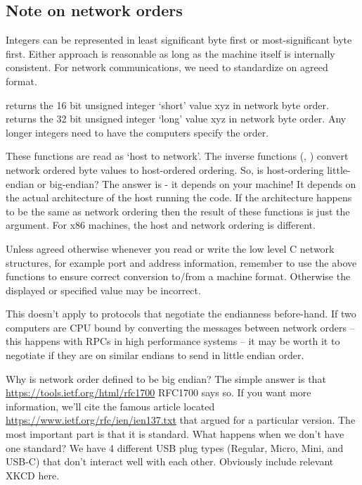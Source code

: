 \subsection{Note on network orders}

Integers can be represented in least significant byte first or most-significant byte first.
Either approach is reasonable as long as the machine itself is internally consistent.
For network communications, we need to standardize on agreed format.

 returns the 16 bit unsigned integer `short' value xyz in network byte order.
 returns the 32 bit unsigned integer `long' value xyz in network byte order.
Any longer integers need to have the computers specify the order.

These functions are read as `host to network'.
The inverse functions (, ) convert network ordered byte values to host-ordered ordering.
So, is host-ordering little-endian or big-endian?
The answer is - it depends on your machine!
It depends on the actual architecture of the host running the code.
If the architecture happens to be the same as network ordering then the result of these functions is just the argument.
For x86 machines, the host and network ordering is different.

Unless agreed otherwise whenever you read or write the low level C network structures, for example port and address information, remember to use the above functions to ensure correct conversion to/from a machine format.
Otherwise the displayed or specified value may be incorrect.

This doesn't apply to protocols that negotiate the endianness before-hand.
If two computers are CPU bound by converting the messages between network orders -- this happens with RPCs in high performance systems -- it may be worth it to negotiate if they are on similar endians to send in little endian order.

Why is network order defined to be big endian?
The simple answer is that \url{https://tools.ietf.org/html/rfc1700} RFC1700 says so.
If you want more information, we'll cite the famous article located \url{https://www.ietf.org/rfc/ien/ien137.txt} that argued for a particular version.
The most important part is that it is standard.
What happens when we don't have one standard?
We have 4 different USB plug types (Regular, Micro, Mini, and USB-C) that don't interact well with each other.
Obviously include relevant XKCD here.

